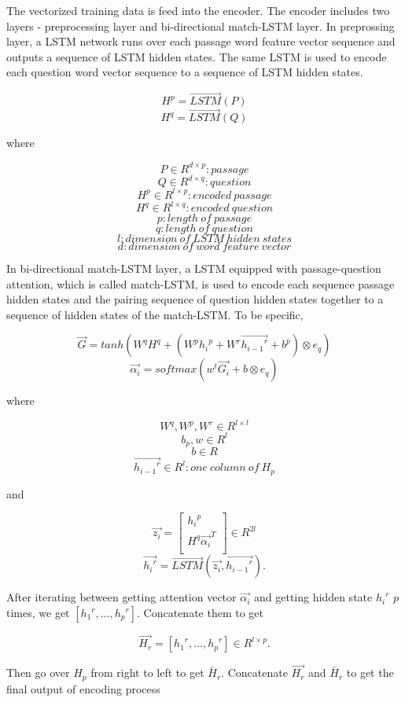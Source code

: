 \documentclass[modernstyle,12pt]{sjsuthesis}
\theoremstyle{definition}
\begin{document}
The vectorized training data is feed into the encoder. The encoder includes two layers - preprocessing layer and bi-directional match-LSTM layer. In preprossing layer, a LSTM network runs over each passage word feature vector sequence and outputs a sequence of LSTM hidden states. The same LSTM is used to encode each question word vector sequence to a sequence of LSTM hidden states.

$$H^p = \overrightarrow{LSTM}(P)$$
$$H^q = \overrightarrow{LSTM}(Q)$$

where

 $$P\in R^{d \times p}: passage$$
 $$Q\in R^{d \times q}: question$$
 $$H^p\in R^{l \times p}: encoded\ passage$$
 $$H^q\in R^{l \times q}: encoded\ question$$
 $$p: length \ of\ passage$$
 $$q: length\ of\ question$$
 $$l: dimension\ of\ LSTM\ hidden\ states$$
 $$d: dimension\ of\ word\ feature\ vector$$

In bi-directional match-LSTM layer, a LSTM equipped with passage-question attention, which is called match-LSTM, is used to encode each sequence passage hidden states and the pairing sequence of question hidden states together to a sequence of hidden states of the match-LSTM. To be specific,

$$\overrightarrow{G} = tanh(W^qH^q + (W^p{h_i}^p + W^r\overrightarrow{{h_{i-1}}^r} + b^p) \otimes e_q)$$
$$\overrightarrow{\alpha _i} = softmax(w^t\overrightarrow{G_i} + b \otimes e_q)$$


where

$$W^q, W^p, W^r\in R^{l \times l} $$
$$b_p, w\in R^{l}  $$
$$b \in R $$
$$\overrightarrow{{h_{i-1}}^r}\in R^{l}: one\ column\ of\ H_p  $$

and

\[ \overrightarrow{z_i} =
\begin{bmatrix}
{h_i}^p \\
H^q\overrightarrow{ {\alpha _i}}^T \\
\end{bmatrix}
\in R^{2l}
\]
$$\overrightarrow{{h_i}^r} = \overrightarrow{LSTM}(\overrightarrow{z_i}, \overrightarrow{{h_{i-1}}^r}).$$

After iterating between getting attention vector $\overrightarrow{\alpha _i}$ and getting hidden state ${{h_{i}}^r}$ $p$ times, we get $[{{h_{1}}^r}, ..., {{h_{p}}^r}]$. Concatenate them to get

$$\overrightarrow{H_r} = [{{h_{1}}^r}, ..., {{h_{p}}^r}] \in R^{l \times p}.$$

Then go over $H_p$ from right to left to get $\overleftarrow{H_r}$. Concatenate $\overrightarrow{H_r}$ and $\overleftarrow{H_r}$ to get the final output of encoding process
\end{document}
